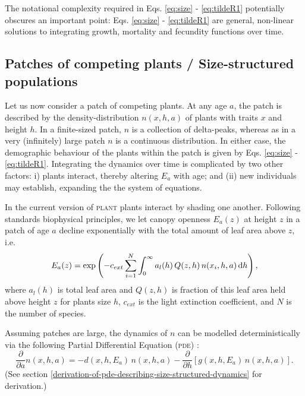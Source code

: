 \documentclass[10pt,twoside]{article}
\newcommand{\plant}{\textsc{plant}}
\begin{document}
The notational complexity required in Eqs. \ref{eq:size} -
\ref{eq:tildeR1} potentially obscures an important point: Eqs.
\ref{eq:size} - \ref{eq:tildeR1} are general, non-linear solutions to
integrating growth, mortality and fecundity functions over time.

\subsection{Patches of competing plants / Size-structured
populations}\label{patches-of-competing-plants-size-structured-populations}

Let us now consider a patch of competing plants. At any age \(a\), the
patch is described by the density-distribution \(n(x,h,a)\) of plants
with traits \(x\) and height \(h\). In a finite-sized patch, \(n\) is a
collection of delta-peaks, whereas as in a very (infinitely) large patch
\(n\) is a continuous distribution. In either case, the demographic
behaviour of the plants within the patch is given by Eqs. \ref{eq:size}
- \ref{eq:tildeR1}. Integrating the dynamics over time is complicated by
two other factors: i) plants interact, thereby altering \(E_a\) with
age; and (ii) new individuals may establish, expanding the the system of
equations.

In the current version of {\plant} plants interact by shading one another.
Following standards biophysical principles, we let canopy openness
\(E_a(z)\) at height \(z\) in a patch of age \(a\) decline exponentially
with the total amount of leaf area above \(z\), i.e.
\begin{equation} \label{eq:light}
  E_a(z) = \exp \left(-c_{ext}  \sum_{i=1}^{N} \int_{0}^{\infty} a_l(h) \, Q(z, h) \, n(x_i,h,a) \, {\rm d}h \right),
\end{equation}
where \(a_l(h)\) is total leaf area and \(Q(z, h)\) is fraction of
this leaf area held above height \(z\) for plants size \(h\),
\(c_{ext}\) is the light extinction coefficient, and \(N\) is the number
of species.

Assuming patches are large, the dynamics of \(n\) can be modelled
deterministically via the following Partial Differential Equation (\textsc{pde})
\citep{Kohyama-1993, Deroos-1997, Moorcroft-2001}:
\begin{equation} \label{eq:PDE} 
  \frac{\partial }{\partial a} n(x,h,a)= -d(x,h, E_a) \, n(x,h,a)-\frac{\partial }{\partial h} \left[g(x,h,E_a) \, n(x,h,a)\right].
\end{equation}
(See section \ref{derivation-of-pde-describing-size-structured-dynamics} for derivation.)
\end{document}
